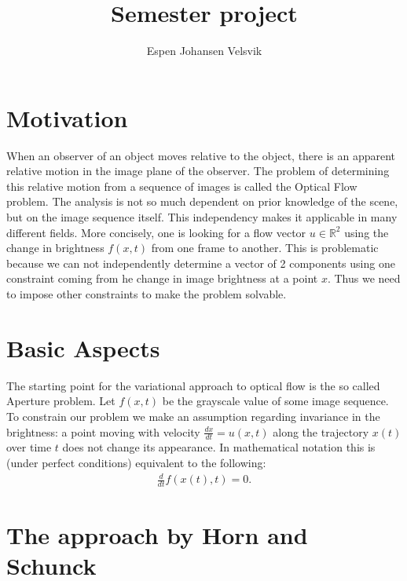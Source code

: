 \documentclass[10pt,a4paper]{article}
\begin{document}
\title{Semester project}
\author{Espen Johansen Velsvik}
\maketitle

\section*{Motivation}
When an observer of an object moves relative to the object, there is an apparent relative motion in the image plane of the observer. The problem of determining this relative motion from a sequence of images is called the Optical Flow problem. The analysis is not so much dependent on prior knowledge of the scene, but on the image sequence itself. This independency makes it applicable in many different fields. More concisely, one is looking for a flow vector $u \in \mathbb{R}^2$ using the change in brightness $f(x,t)$ from one frame to another. This is problematic because we can not independently determine a vector of 2 components using one constraint coming from he change in image brightness at a point $x$. Thus we need to impose other constraints to make the problem solvable.

\section*{Basic Aspects}
The starting point for the variational approach to optical flow is the so called Aperture problem. Let $f(x,t)$ be the grayscale value of some image sequence. To constrain our problem we make an assumption regarding invariance in the brightness: a point moving with velocity $\frac{dx}{dt} = u(x,t)$ along the trajectory $x(t)$ over time $t$ does not change its appearance. In mathematical notation this is (under perfect conditions) equivalent to the following:
\begin{align*}
\frac{d}{dt}f(x(t),t) = 0.
\end{align*}

\section*{The approach by Horn and Schunck}
\end{document}
